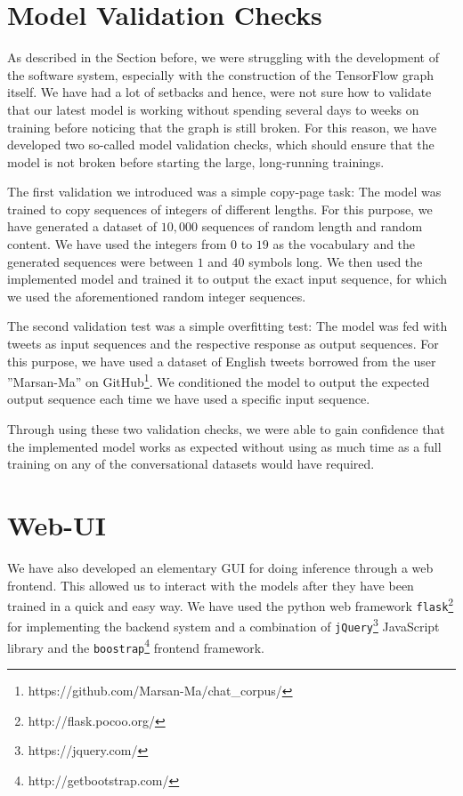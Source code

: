 \section{Model Validation Checks}
\label{software_sytem:model_validation_checks}
As described in the Section before, we were struggling with the development of the software system, especially with the construction of the TensorFlow graph itself. We have had a lot of setbacks and hence, were not sure how to validate that our latest model is working without spending several days to weeks on training before noticing that the graph is still broken. For this reason, we have developed two so-called model validation checks, which should ensure that the model is not broken before starting the large, long-running trainings.

The first validation we introduced was a simple copy-page task: The model was trained to copy sequences of integers of different lengths. For this purpose, we have generated a dataset of $10,000$ sequences of random length and random content. We have used the integers from $0$ to $19$ as the vocabulary and the generated sequences were between $1$ and $40$ symbols long. We then used the implemented model and trained it to output the exact input sequence, for which we used the aforementioned random integer sequences. 

The second validation test was a simple overfitting test: The model was fed with tweets as input sequences and the respective response as output sequences. For this purpose, we have used a dataset of English tweets borrowed from the user ''Marsan-Ma'' on GitHub\footnote{https://github.com/Marsan-Ma/chat\_corpus/}. We conditioned the model to output the expected output sequence each time we have used a specific input sequence.

Through using these two validation checks, we were able to gain confidence that the implemented model works as expected without using as much time as a full training on any of the conversational datasets would have required.

\section{Web-UI}
We have also developed an elementary GUI for doing inference through a web frontend. This allowed us to interact with the models after they have been trained in a quick and easy way. We have used the python web framework \texttt{flask}\footnote{http://flask.pocoo.org/} for implementing the backend system and a combination of \texttt{jQuery}\footnote{https://jquery.com/} JavaScript library and the \texttt{boostrap}\footnote{http://getbootstrap.com/} frontend framework.

